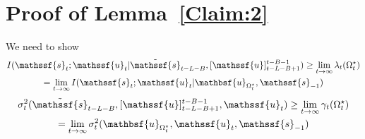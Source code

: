 \documentclass[journal, twocolumn, 10pt]{IEEEtran}
\newcommand{\rvs}{{\mathssf{s}}}    %
\newcommand{\rvu}{{\mathssf{u}}}    %
\newcommand{\rvbu}{{\mathbsf{u}}}
\begin{document}
{\section{Proof of Lemma~\ref{Claim:2}}
\label{App:Claim2}

We need to show 
\begin{multline}
I(\rvs_{t};\rvu_{t} | \tilde{\rvs}_{t-L-B} ,  [\rvu]_{t-L-B+1}^{t-B-1})\ge \lim_{t\to \infty} \lambda_{t}(\Omega^{\star}_t)\\ = \lim_{t\to \infty} I(\rvs_{t};\rvu_{t} | \rvbu_{\Omega^{\star}_{t}}, \rvs_{-1})\label{AppEq1}\end{multline}
\begin{multline} \sigma^{2}_{t}( \tilde{\rvs}_{t-L-B}, [\rvu]_{t-L-B+1}^{t-B-1},\rvu_{t})\ge \lim_{t\to \infty} \gamma_{t}(\Omega^{\star}_t) \\ = \lim_{t\to \infty} \sigma^{2}_{t}( \rvbu_{\Omega^{\star}_{t}}, \rvu_{t}, \rvs_{-1})\label{AppEq2}
\end{multline}

}
\end{document}
